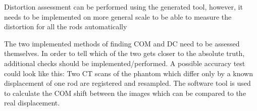 Distortion assessment can be performed using the generated tool, however, it needs to be implemented on more general scale to be able to measure the distortion for all the rods automatically

The two implemented methods of finding COM and DC need to be assessed themselves.
In order to tell which of the two gets closer to the absolute truth, additional checks should be implemented/performed.
A possible accuracy test could look like this:
Two CT scans of the phantom which differ only by a known displacement of one rod are registered and resampled.
The software tool is used to calculate the COM shift between the images which can be compared to the real displacement.
